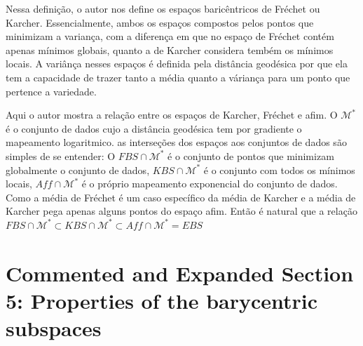 \documentclass[a4paper,titlepage]{article}
\begin{document}
Nessa definição, o autor nos define os espaços baricêntricos de Fréchet ou Karcher. Essencialmente, ambos os espaços compostos pelos pontos que minimizam a variança, com a diferença em que no espaço de Fréchet contém apenas mínimos globais, quanto a de Karcher considera tembém os mínimos locais. A variânça nesses espaços é definida pela distância geodésica por que ela tem a capacidade de trazer tanto a média quanto a váriança para um ponto que pertence a variedade.

{
\vspace{1em}
\vspace{1em}
}

Aqui o autor mostra a relação entre os espaços de Karcher, Fréchet  e afim. O $\mathcal{M}^*$ é o conjunto de dados cujo a distância geodésica tem por gradiente o mapeamento logaritmico. as interseções dos espaços aos conjuntos de dados são simples de se entender: O $FBS \cap \mathcal{M}^*$ é o conjunto de pontos que minimizam globalmente o conjunto de dados, $KBS \cap \mathcal{M}^*$
é o conjunto com todos os mínimos locais, $Aff \cap \mathcal{M}^*$ é o próprio mapeamento exponencial do conjunto de dados. Como a média de Fréchet é um caso específico da média de Karcher e a média de Karcher pega apenas alguns pontos do espaço afim. Então é natural que a relação $FBS \cap \mathcal{M}^* \subset KBS \cap \mathcal{M}^* \subset Aff \cap \mathcal{M}^* = EBS$

\section{Commented and Expanded Section 5: Properties of the barycentric
subspaces}

{
\vspace{1em}
\vspace{1em}
}
\end{document}

